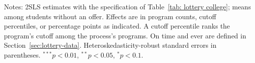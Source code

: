 \begin{table}[htp!]
\singlespacing\renewcommand{\arraystretch}{1.2}
\centering
\caption{{Effect of Attending an Over-Demanded School on Application Choices}}\label{tab: lottery application choices}
\small
\setlength{\tabcolsep}{6pt}

\par\smallskip
\begin{minipage}{\textwidth}\footnotesize
{Notes: 2SLS estimates with the specification of Table~\ref{tab: lottery college}; means among students without an offer. Effects are in program counts, cutoff percentiles, or percentage points as indicated. A cutoff percentile ranks the program's cutoff among the process's programs. On time and ever are defined in Section~\ref{sec:lottery-data}. Heteroskedasticity-robust standard errors in parentheses. $^{***}p<0.01$, $^{**}p<0.05$, $^{*}p<0.1$.}
\end{minipage}
\end{table}
